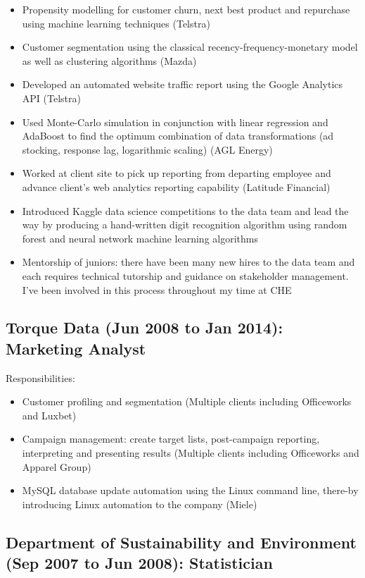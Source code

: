 \documentclass{article}
\begin{document}
\begin{itemize}
    \item Propensity modelling for customer churn, next best product and repurchase using machine learning techniques (Telstra)
    \item Customer segmentation using the classical recency-frequency-monetary model as well as clustering algorithms (Mazda)
    \item Developed an automated website traffic report using the Google Analytics API (Telstra)
    \item Used Monte-Carlo simulation in conjunction with linear regression and AdaBoost to find the optimum combination of data transformations (ad stocking, response lag, logarithmic scaling) (AGL Energy)
    \item Worked at client site to pick up reporting from departing employee and advance client's web analytics reporting capability (Latitude Financial)
    \item Introduced Kaggle data science competitions to the data team and lead the way by producing a hand-written digit recognition algorithm using random forest and neural network machine learning algorithms
    \item Mentorship of juniors: there have been many new hires to the data team and each requires technical tutorship and guidance on stakeholder management. I've been involved in this process throughout my time at CHE
\end{itemize}

\subsection{Torque Data (Jun 2008 to Jan 2014): Marketing Analyst}

Responsibilities:
\begin{itemize}
    \item Customer profiling and segmentation (Multiple clients including Officeworks and Luxbet) 
    \item Campaign management: create target lists, post-campaign reporting, interpreting and presenting results (Multiple clients including Officeworks and Apparel Group)
    \item MySQL database update automation using the Linux command line, there\hyp{}by introducing Linux automation to the company (Miele)
\end{itemize}

\subsection{Department of Sustainability and Environment (Sep 2007 to Jun 2008): Statistician}
\end{document}

